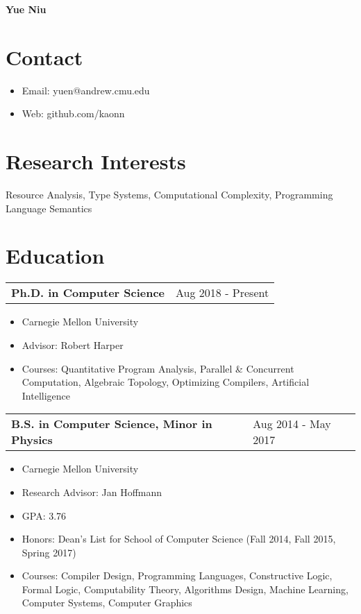 \documentclass[12pt]{article}
\renewcommand{\maketitle}{
\begin{center}
{\huge\bfseries Yue Niu}\\
\end{center}
}
\begin{document}
\maketitle

\section{Contact}
\begin{itemize}
\itemsep-2pt
\item Email: yuen@andrew.cmu.edu 
\item Web: github.com/kaonn 
\end{itemize}

\section{Research Interests}

Resource Analysis, Type Systems, Computational Complexity, Programming Language Semantics\\

\section{Education}

\begin{tabu} to 
Ph.D. in Computer Science & Aug 2018 - Present
\end{tabu}

\vspace{-5pt}
\begin{itemize}
\itemsep-5pt
\item Carnegie Mellon University
\item Advisor: Robert Harper
\item Courses: 
   Quantitative Program Analysis,
   Parallel \& Concurrent Computation, 
   Algebraic Topology,
   Optimizing Compilers, 
   Artificial Intelligence
\end{itemize}

\begin{tabu} to 
B.S. in Computer Science, Minor in Physics & Aug 2014 - May 2017
\end{tabu}

\vspace{-5pt}
\begin{itemize}
\itemsep-2pt
\item Carnegie Mellon University
\item Research Advisor: Jan Hoffmann
\item GPA: 3.76
\item Honors: Dean's List for School of Computer Science (Fall 2014, Fall  2015, Spring 2017)
\item Courses: 
   Compiler Design,
   Programming Languages, 
   Constructive Logic, Formal Logic, 
   Computability Theory, Algorithms Design,
   Machine Learning, Computer Systems, Computer Graphics
\end{itemize}
\end{document}
